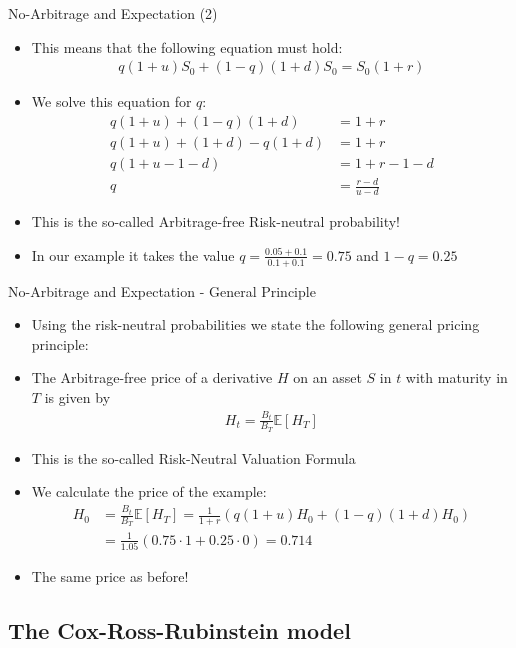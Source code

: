 {No-Arbitrage and Expectation (2)}
\begin{itemize}
  \item This means that the following equation must hold:
  \begin{align*}
    q (1+u) S_0 + (1-q) (1+d) S_0 = S_0 (1+r)
  \end{align*}
  \item We solve this equation for $q$:
  \begin{align*}
    q (1+u) + (1-q) (1+d) & = 1+r \\
    q (1+u) + (1+d) -q (1+d) & = 1+r \\
    q (1+u - 1 -d) & = 1+r -1 - d\\
    q & = \frac{r-d}{u-d}
  \end{align*}
  \item This is the so-called Arbitrage-free Risk-neutral probability!
  \item In our example it takes the value $q = \frac{0.05 + 0.1}{0.1 + 0.1} = 0.75$ and $1-q=0.25$
\end{itemize}

{No-Arbitrage and Expectation - General Principle}
\begin{itemize}
  \item Using the risk-neutral probabilities we state the following general pricing principle:
  \item The Arbitrage-free price of a derivative $H$ on an asset $S$ in $t$ with maturity in $T$ is given by
  \begin{align*}
    H_t = \frac{B_t}{B_T} \mathbb{E}[H_T]
  \end{align*}
  \item This is the so-called Risk-Neutral Valuation Formula
  \vspace{0.3cm}
  \item We calculate the price of the example:
  \begin{align*}
    H_0 & = \frac{B_t}{B_T} \mathbb{E}[H_T] = \frac{1}{1+r} (q (1+u) H_0 + (1-q) (1+d) H_0) \\
    & = \frac{1}{1.05} (0.75 \cdot 1 + 0.25 \cdot 0) = 0.714
  \end{align*}
  \item The same price as before!
\end{itemize}

\subsection{The Cox-Ross-Rubinstein model}
